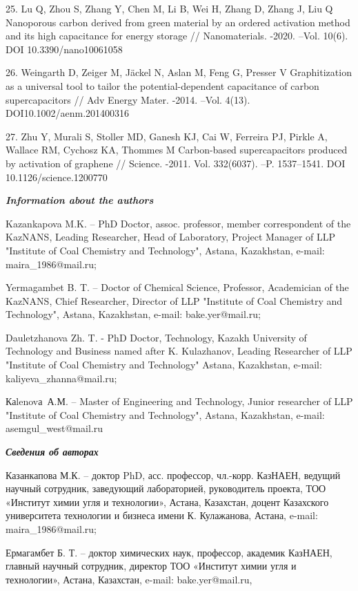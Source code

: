 25. Lu Q, Zhou S, Zhang Y, Chen M, Li B, Wei H, Zhang D, Zhang J, Liu Q
Nanoporous carbon derived from green material by an ordered activation
method and its high capacitance for energy storage // Nanomaterials.
-2020. --Vol. 10(6). DOI 10.3390/nano10061058

26. Weingarth D, Zeiger M, Jäckel N, Aslan M, Feng G, Presser V
Graphitization as a universal tool to tailor the potential-dependent
capacitance of carbon supercapacitors // Adv Energy Mater. -2014. --Vol.
4(13). DOI10.1002/aenm.201400316

27. Zhu Y, Murali S, Stoller MD, Ganesh KJ, Cai W, Ferreira PJ, Pirkle
A, Wallace RM, Cychosz KA, Thommes M Carbon-based supercapacitors
produced by activation of graphene // Science. -2011. Vol. 332(6037).
--P. 1537--1541. DOI 10.1126/science.1200770

\emph{\textbf{Information about the authors}}

Kazankapova M.K. -- PhD Doctor, assoc. professor, member correspondent
of the KazNANS, Leading Researcher, Head of Laboratory, Project Manager
of LLP "Institute of Coal Chemistry and Technology", Astana, Kazakhstan,
e-mail: maira\_1986@mail.ru;

Yermagambet B. T. -- Doctor of Chemical Science, Professor, Academician
of the KazNANS, Chief Researcher, Director of LLP "Institute of Coal
Chemistry and Technology", Astana, Kazakhstan, e-mail: bake.yer@mail.ru;

Dauletzhanova Zh. T. - PhD Doctor, Technology, Kazakh University of
Technology and Business named after K. Kulazhanov, Leading Researcher of
LLP "Institute of Coal Chemistry and Technology" Astana, Kazakhstan,
e-mail: kaliyeva\_zhanna@mail.ru;

Каlenovа~А.М. -- Master of Engineering and Technology, Junior researcher
of LLP "Institute of Coal Chemistry and Technology", Astana, Kazakhstan,
e-mail: asemgul\_west@mail.ru ~

\emph{\textbf{Сведения об авторах}}

Казанкапова М.К. -- доктор PhD, асс. профессор, чл.-корр. КазНАЕН,
ведущий научный сотрудник, заведующий лабораторией, руководитель
проекта, ТОО «Институт химии угля и технологии», Астана, Казахстан,
доцент Казахского университета технологии и бизнеса имени К. Кулажанова,
Астана, e-mail: maira\_1986@mail.ru;

Ермагамбет Б. Т. -- доктор химических наук, профессор, академик КазНАЕН,
главный научный сотрудник, директор ТОО «Институт химии угля и
технологии», Астана, Казахстан, e-mail: bake.yer@mail.ru,

